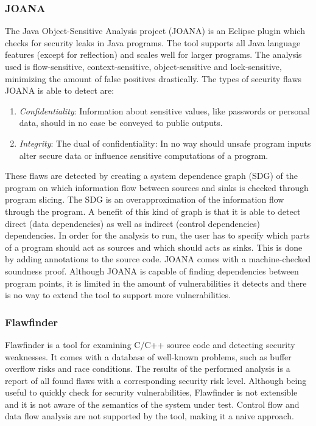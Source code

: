 \subsubsection*{JOANA}
The Java Object-Sensitive Analysis project (JOANA\cite{JOANA}) is an Eclipse plugin which checks for security leaks in Java programs. The tool supports all Java language features (except for reflection) and scales well for larger programs. The analysis used is flow-sensitive, context-sensitive, object-sensitive and lock-sensitive, minimizing the amount of false positives drastically. The types of security flaws JOANA is able to detect are:
\begin{enumerate}
\item \textit{Confidentiality}: Information about sensitive values, like passwords or personal data, should in no case be conveyed to public outputs.
\item \textit{Integrity}: The dual of confidentiality: In no way should unsafe program inputs alter secure data or influence sensitive computations of a program.
\end{enumerate}
These flaws are detected by creating a system dependence graph (SDG) of the program on which information flow between sources and sinks is checked through program slicing. The SDG is an overapproximation of the information flow through the program. A benefit of this kind of graph is that it is able to detect direct (data dependencies) as well as indirect (control dependencies) dependencies. In order for the analysis to run, the user has to specify which parts of a program should act as sources and which should acts as sinks. This is done by adding annotations to the source code. JOANA comes with a machine-checked soundness proof. Although JOANA is capable of finding dependencies between program points, it is limited in the amount of vulnerabilities it detects and there is no way to extend the tool to support more vulnerabilities.

\subsubsection*{Flawfinder}
Flawfinder\cite{flawfinder} is a tool for examining C/C++ source code and detecting security weaknesses. It comes with a database of well-known problems, such as buffer overflow risks and race conditions. The results of the performed analysis is a report of all found flaws with a corresponding security risk level. Although being useful to quickly check for security vulnerabilities, Flawfinder is not extensible and it is not aware of the semantics of the system under test. Control flow and data flow analysis are not supported by the tool, making it a naive approach.

